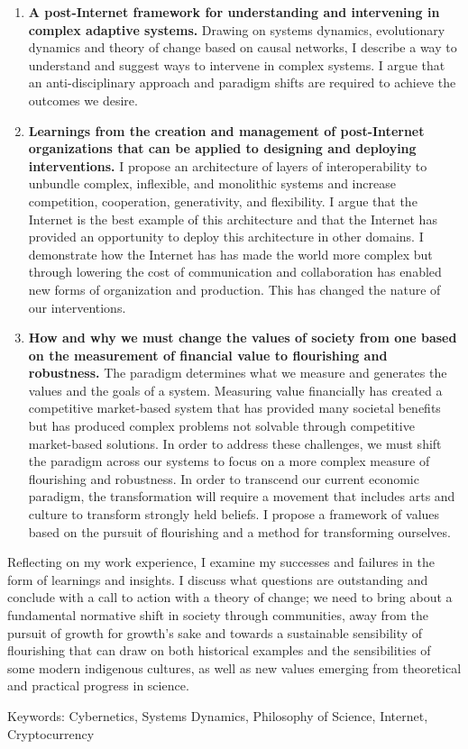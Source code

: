 \begin{enumerate}
\item \textbf{A post-Internet framework for understanding and intervening in complex adaptive systems.} Drawing on systems dynamics, evolutionary dynamics and theory of change based on causal networks, I describe a way to understand and suggest ways to intervene in complex systems. I argue that an anti-disciplinary approach and paradigm shifts are required to achieve the outcomes we desire.
\item \textbf{Learnings from the creation and management of post-Internet organizations that can be applied to designing and deploying interventions.} I propose an architecture of layers of interoperability to unbundle complex, inflexible, and monolithic systems and increase competition, cooperation, generativity, and flexibility. I argue that the Internet is the best example of this architecture and that the Internet has provided an opportunity to deploy this architecture in other domains. I demonstrate how the Internet has has made the world more complex but through lowering the cost of communication and collaboration has enabled new forms of organization and production. This has changed the nature of our interventions.
\item \textbf{How and why we must change the values of society from one based on the measurement of financial value to flourishing and robustness.} The paradigm determines what we measure and generates the values and the goals of a system. Measuring value financially has created a competitive market-based system that has provided many societal benefits but has produced complex problems not solvable through competitive market-based solutions. In order to address these challenges, we must shift the paradigm across our systems to focus on a more complex measure of flourishing and robustness. In order to transcend our current economic paradigm, the transformation will require a movement that includes arts and culture to transform strongly held beliefs. I propose a framework of values based on the pursuit of flourishing and a method for transforming ourselves.
\end{enumerate}

Reflecting on my work experience, I examine my successes and failures in the form of learnings and insights. I discuss what questions are outstanding and conclude with a call to action with a theory of change; we need to bring about a fundamental normative shift in society through communities, away from the pursuit of growth for growth's sake and towards a sustainable sensibility of flourishing that can draw on both historical examples and the sensibilities of some modern indigenous cultures, as well as new values emerging from theoretical and practical progress in science.

\vfill

Keywords: Cybernetics, Systems Dynamics, Philosophy of Science, Internet, Cryptocurrency

\endgroup